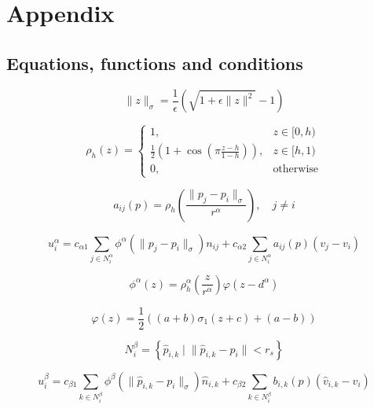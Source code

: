 \documentclass[conference]{IEEEtran}
\begin{document}
\section*{Appendix}

\subsection*{Equations, functions and conditions}
\begin{equation}
\| z \|_{\sigma} = \frac{1}{\epsilon} \left( \sqrt{1 + \epsilon \| z \|^2} - 1 \right)
\label{eq:16}
\end{equation}

\begin{equation}
\rho_h(z) =
\begin{cases}
1, & z \in [0, h) \\
\frac{1}{2} \left( 1 + \cos \left( \pi \frac{z - h}{1 - h} \right) \right), & z \in [h, 1) \\
0, & \text{otherwise}
\end{cases}
\label{eq:17}
\end{equation}

\begin{equation}
a_{ij}(p) = \rho_h \left( \frac{\| p_j - p_i \|_{\sigma}}{r^{\alpha}} \right), \quad j \neq i
\label{eq:18}
\end{equation}

\begin{equation}
u^{\alpha}_i = c_{\alpha 1} \sum_{j \in N^{\alpha}_i} \phi^{\alpha} \left( \| p_j - p_i \|_{\sigma} \right) n_{ij}
+ c_{\alpha 2} \sum_{j \in N^{\alpha}_i} a_{ij}(p) (v_j - v_i)
\label{eq:19}
\end{equation}

\begin{equation}
\phi^{\alpha}(z) = \rho^{\alpha}_h \left( \frac{z}{r^{\alpha}} \right) \varphi(z - d^{\alpha})
\label{eq:20}
\end{equation}

\begin{equation}
\varphi(z) = \frac{1}{2} \left( (a + b) \sigma_1(z + c) + (a - b) \right)
\label{eq:21}
\end{equation}

\begin{equation}
N^{\beta}_i = \left\{ \hat{p}_{i,k} \;\big|\; \| \hat{p}_{i,k} - p_i \| < r_s \right\}
\label{eq:22}
\end{equation}

\begin{equation}
u^{\beta}_i = c_{\beta 1} \sum_{k \in N^{\beta}_i} \phi^{\beta} \left( \| \hat{p}_{i,k} - p_i \|_{\sigma} \right) \hat{n}_{i,k}
+ c_{\beta 2} \sum_{k \in N^{\beta}_i} b_{i,k}(p) (\hat{v}_{i,k} - v_i)
\label{eq:23}
\end{equation}
\end{document}
